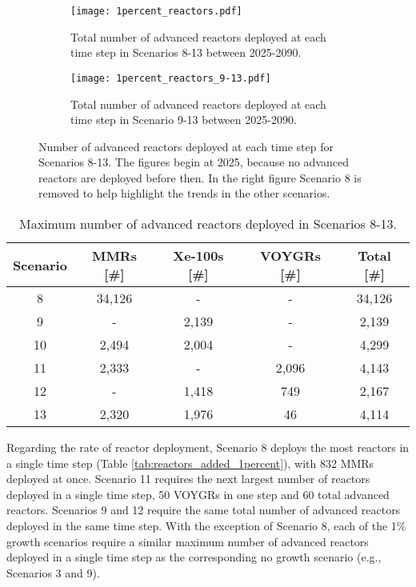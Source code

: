 \begin{figure}
    \centering
    \begin{subfigure}[b]{0.45\textwidth}
        \centering
        \texttt{[image: 1percent\_reactors.pdf]}
        \caption{Total number of advanced reactors deployed at 
        each time step in Scenarios 8-13 between 2025-2090.}
        \label{fig:1percent_reactors_all}
    \end{subfigure}
    \hfill
    \begin{subfigure}[b]{0.45\textwidth}
        \centering
        \texttt{[image: 1percent\_reactors\_9-13.pdf]}
        \caption{Total number of advanced reactors deployed at 
        each time step in Scenario 9-13 between 2025-2090.}
        \label{fig:1percent_reactors_9-13}
    \end{subfigure}
       \caption{Number of advanced reactors deployed at each time step 
       for Scenarios 8-13. The figures begin at 2025, because no advanced 
       reactors are deployed before then. In the right figure Scenario 
       8 is removed to help highlight the trends in the other scenarios.}
       \label{fig:1percent_reactors}
\end{figure}

\begin{table}
    \centering 
    \caption{Maximum number of advanced reactors deployed in Scenarios 8-13.}
    \label{tab:reactors_1percent}
    \begin{tabular}{c c c c c}
        \hline
        Scenario & \glspl{MMR} [\#]& Xe-100s [\#]& VOYGRs [\#] 
        & Total [\#]\\\hline
        8 & 34,126 & - & - & 34,126\\
        9 & - & 2,139 & - & 2,139 \\
        10 & 2,494 & 2,004 & - & 4,299\\
        11 & 2,333 & - & 2,096 & 4,143\\
        12 & - & 1,418 & 749 & 2,167\\
        13 & 2,320 & 1,976 & 46 & 4,114\\
        \hline
    \end{tabular}
\end{table}

Regarding the rate of reactor deployment, Scenario 8 deploys the most 
reactors in a single time step (Table 
\ref{tab:reactors_added_1percent}), with 832 \glspl{MMR} deployed at once. 
Scenario 11 requires the next largest number of reactors deployed in 
a single time step, 50 VOYGRs in one step and 60 total advanced reactors. 
Scenarios 9 and 12 require the same total number of advanced reactors 
deployed in the same time step. With the exception of Scenario 8, each of 
the 1\% growth scenarios require a similar maximum number of advanced 
reactors deployed in a single time step as the corresponding no growth 
scenario (e.g., Scenarios 3 and 9). 

